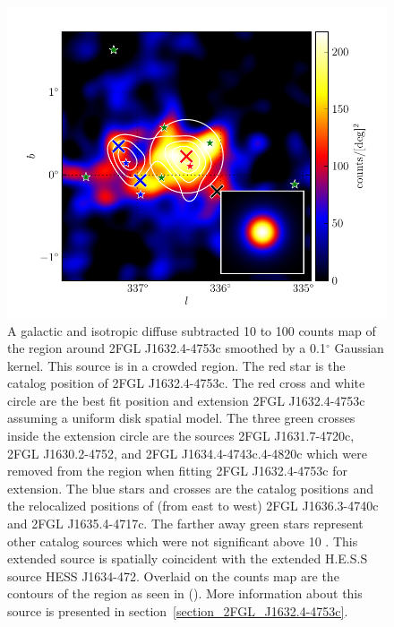 \documentclass[12pt,preprint]{aastex}
\newcommand{\gev}{\text{GeV}\xspace}
\newcommand{\tev}{\text{TeV}\xspace}
\renewcommand{\deg}{\ensuremath{^\circ}\xspace}
\begin{document}
\begin{figure}
  \begin{center}
    \includegraphics[type=pdf,ext=.pdf,read=.pdf]{source_plots/source_1FGL_J1632.9-4802c}
  \end{center}
  \caption{A galactic and isotropic diffuse subtracted 10 \gev to 100
  \gev counts map of the region around 2FGL J1632.4-4753c smoothed by
  a 0.1\deg Gaussian kernel.  This source is in a crowded region.
  The red star is the catalog position of 2FGL J1632.4-4753c.  The red
  cross and white circle are the best fit position and extension 2FGL
  J1632.4-4753c assuming a uniform disk spatial model.  The three
  green crosses inside the extension circle are the sources 2FGL
  J1631.7-4720c, 2FGL J1630.2-4752, and 2FGL J1634.4-4743c.4-4820c
  which were removed from the region when fitting 2FGL J1632.4-4753c
  for extension.  The blue stars and crosses are the catalog
  positions and the relocalized positions of (from east to west)
  2FGL J1636.3-4740c and 2FGL J1635.4-4717c.  The farther away green
  stars represent other catalog sources which were not significant
  above 10 \gev.  This extended source is spatially coincident
  with the extended H.E.S.S source HESS J1634-472.  Overlaid on
  the counts map are the contours of the region as seen in \tev
  (\cite{HESS_plane_survey}). More information about this source is
  presented in section~\ref{section_2FGL_J1632.4-4753c}.
  }\label{1FGL_J1632.9-4802c}
\end{figure}
\end{document}
